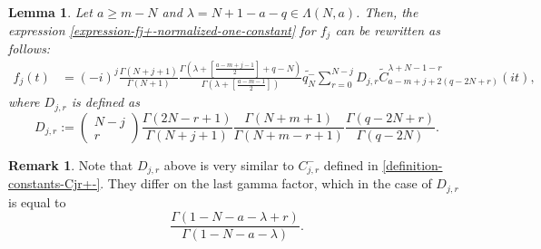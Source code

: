 \documentclass[12pt, pdflatex, a4paper]{article}
\theoremstyle{plain}
\newtheorem{lemma}[thm]{Lemma}
\theoremstyle{definition}
\newtheorem{rem}[thm]{Remark}
\def\Geg{\widetilde{C}}
\begin{document}
\begin{lemma}\label{lemma-simplification-fj+} Let $a \geq m-N$ and $\lambda = N+1-a-q\in \Lambda(N,a)$. Then, the expression \eqref{expression-fj+-normalized-one-constant} for $f_j$ can be rewritten as follows:
\begin{align}\label{expression-fj+-normalized-final}
f_j(t) &= (-i)^j\frac{\Gamma(N+j+1)}{\Gamma(N+1)}\frac{\Gamma\left(\lambda+\left[\frac{a-m+j-1}{2}\right] +q-N\right)}{\Gamma\left(\lambda+\left[\frac{a-m-1}{2}\right]\right)}\widetilde{q_N^-}\sum_{r=0}^{N-j}D_{j,r}\Geg_{a-m+j+2(q-2N+r)}^{\lambda+N-1-r}(it),
\end{align}
where $D_{j,r}$ is defined as
\begin{equation}\label{def-constants-Djr}
D_{j, r} := \begin{pmatrix}
N-j\\
r
\end{pmatrix}
\frac{\Gamma(2N-r+1)}{\Gamma(N+j+1)}
\frac{\Gamma(N + m+1)}{\Gamma(N + m -r +1)}
\frac{\Gamma(q-2N+r)}{\Gamma(q-2N)}.
\end{equation}
\end{lemma}
\begin{rem} Note that $D_{j,r}$ above is very similar to $C_{j,r}^-$ defined in \eqref{definition-constants-Cjr+-}. They differ on the last gamma factor, which in the case of $D_{j,r}$ is equal to 
\begin{equation*}
\frac{\Gamma(1-N-a-\lambda+r)}{\Gamma(1-N-a-\lambda)}.
\end{equation*}
\end{rem}
\end{document}
